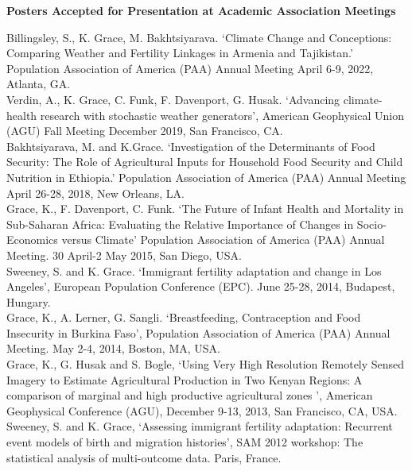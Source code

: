 \documentclass[11pt]{article} %
\begin{document}
\vspace{.5cm}

\noindent
 \textbf {Posters Accepted for Presentation at Academic Association Meetings }
 
 
 \noindent
 Billingsley, S., K. Grace, M. Bakhtsiyarava. `Climate Change and Conceptions: Comparing Weather and Fertility Linkages in Armenia and Tajikistan.'
Population Association of America (PAA) Annual Meeting April 6-9, 2022, Atlanta, GA.\\
 
 \noindent
Verdin, A., K. Grace, C. Funk, F. Davenport, G. Husak. `Advancing climate-health research with stochastic weather generators', American Geophysical Union (AGU)
 Fall Meeting December 2019, San Francisco, CA.\\

\noindent
Bakhtsiyarava, M. and K.Grace. `Investigation of the Determinants of Food Security: The Role of Agricultural Inputs for Household Food Security and Child Nutrition in Ethiopia.' Population Association of America (PAA) Annual Meeting April 26-28, 2018, New Orleans, LA.\\

\noindent
Grace, K., F. Davenport, C. Funk. `The Future of Infant Health and Mortality in Sub-Saharan Africa: Evaluating the Relative Importance of Changes in Socio-Economics versus Climate' Population 
Association of America (PAA) Annual Meeting. 30 April-2 May 2015, San Diego, USA. \\

\noindent
Sweeney, S. and K. Grace. `Immigrant fertility adaptation and change in Los Angeles', European Population Conference (EPC). June 25-28, 2014, Budapest, Hungary.\\

\noindent
Grace, K.,  A. Lerner, G. Sangli. `Breastfeeding, Contraception and Food Insecurity in Burkina Faso', Population Association of America (PAA) Annual Meeting.  May 2-4, 2014, Boston, MA, USA. \\

\noindent
Grace, K., G. Husak and S. Bogle, `Using Very High Resolution Remotely Sensed Imagery to Estimate Agricultural Production in Two Kenyan Regions: A comparison of marginal and high productive agricultural zones ', American Geophysical Conference (AGU), December 9-13, 2013, San Francisco, CA, USA.\\

 
 \noindent
Sweeney, S. and K. Grace, `Assessing immigrant fertility adaptation: Recurrent event models of birth and migration histories', SAM 2012 workshop: The statistical analysis of multi-outcome data. Paris, France.\\
\end{document}
